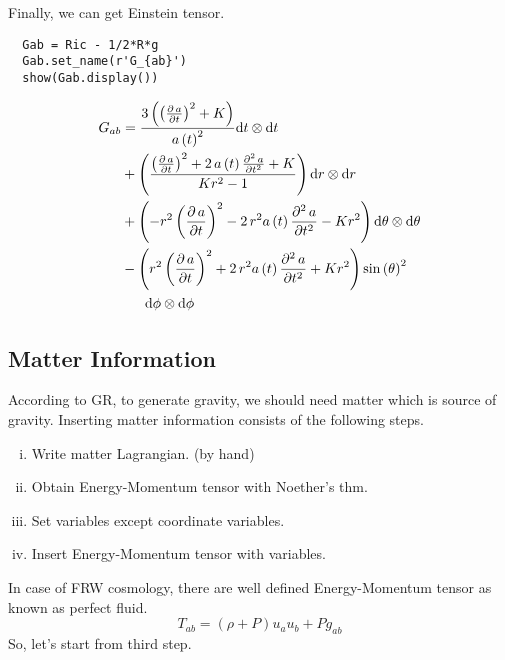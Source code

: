 \documentclass[%
 reprint,
 amsmath,amssymb,
 aps,
]{revtex4-1}
\begin{document}
Finally, we can get Einstein tensor.

\begin{lstlisting}
  Gab = Ric - 1/2*R*g
  Gab.set_name(r'G_{ab}')
  show(Gab.display())
\end{lstlisting}

\begin{equation}
  \begin{aligned}
  G_{ab} &= \frac{3 \, {\left(\left(\frac{\partial\,a}{\partial t}\right)^{2} + K\right)}}{a\left(t\right)^{2}} \mathrm{d} t\otimes \mathrm{d} t\\
  &+ \left( \frac{\left(\frac{\partial\,a}{\partial t}\right)^{2} + 2 \, a\left(t\right) \frac{\partial^2\,a}{\partial t ^ 2} + K}{K r^{2} - 1} \right) \mathrm{d} r\otimes \mathrm{d} r\\
  &+ \left( -r^{2} \left(\frac{\partial\,a}{\partial t}\right)^{2} - 2 \, r^{2} a\left(t\right) \frac{\partial^2\,a}{\partial t ^ 2} - K r^{2} \right) \mathrm{d} {\theta}\otimes \mathrm{d} {\theta}\\
  &-{\left(r^{2} \left(\frac{\partial\,a}{\partial t}\right)^{2} + 2 \, r^{2} a\left(t\right) \frac{\partial^2\,a}{\partial t ^ 2} + K r^{2}\right)} \sin\left({\theta}\right)^{2} \\
  &\HS\HS\mathrm{d} {\phi}\otimes \mathrm{d} {\phi}
  \end{aligned}
\end{equation}

\subsection{Matter Information}

According to GR, to generate gravity, we should need matter which is source of
gravity. Inserting matter information consists of the following steps.

\begin{enumerate}[i)]
\item Write matter Lagrangian. (by hand)
\item Obtain Energy-Momentum tensor with Noether's thm.
\item Set variables except coordinate variables.
\item Insert Energy-Momentum tensor with variables.
\end{enumerate}

In case of FRW cosmology, there are well defined Energy-Momentum tensor as known
as perfect fluid.
\begin{equation}
  T_{ab} = (\rho + P)u_a u_b + Pg_{ab}
\end{equation}
So, let's start from third step.
\end{document}
